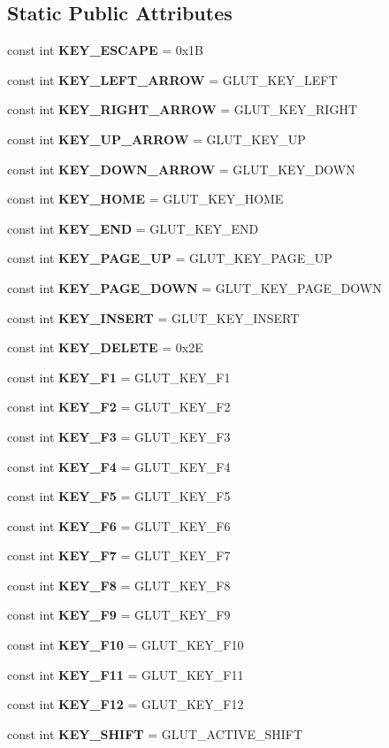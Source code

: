 \subsection*{Static Public Attributes}
\begin{CompactItemize}
\item 
const int {\bf KEY\_\-ESCAPE} = 0x1B
\item 
const int {\bf KEY\_\-LEFT\_\-ARROW} = GLUT\_\-KEY\_\-LEFT
\item 
const int {\bf KEY\_\-RIGHT\_\-ARROW} = GLUT\_\-KEY\_\-RIGHT
\item 
const int {\bf KEY\_\-UP\_\-ARROW} = GLUT\_\-KEY\_\-UP
\item 
const int {\bf KEY\_\-DOWN\_\-ARROW} = GLUT\_\-KEY\_\-DOWN
\item 
const int {\bf KEY\_\-HOME} = GLUT\_\-KEY\_\-HOME
\item 
const int {\bf KEY\_\-END} = GLUT\_\-KEY\_\-END
\item 
const int {\bf KEY\_\-PAGE\_\-UP} = GLUT\_\-KEY\_\-PAGE\_\-UP
\item 
const int {\bf KEY\_\-PAGE\_\-DOWN} = GLUT\_\-KEY\_\-PAGE\_\-DOWN
\item 
const int {\bf KEY\_\-INSERT} = GLUT\_\-KEY\_\-INSERT
\item 
const int {\bf KEY\_\-DELETE} = 0x2E
\item 
const int {\bf KEY\_\-F1} = GLUT\_\-KEY\_\-F1
\item 
const int {\bf KEY\_\-F2} = GLUT\_\-KEY\_\-F2
\item 
const int {\bf KEY\_\-F3} = GLUT\_\-KEY\_\-F3
\item 
const int {\bf KEY\_\-F4} = GLUT\_\-KEY\_\-F4
\item 
const int {\bf KEY\_\-F5} = GLUT\_\-KEY\_\-F5
\item 
const int {\bf KEY\_\-F6} = GLUT\_\-KEY\_\-F6
\item 
const int {\bf KEY\_\-F7} = GLUT\_\-KEY\_\-F7
\item 
const int {\bf KEY\_\-F8} = GLUT\_\-KEY\_\-F8
\item 
const int {\bf KEY\_\-F9} = GLUT\_\-KEY\_\-F9
\item 
const int {\bf KEY\_\-F10} = GLUT\_\-KEY\_\-F10
\item 
const int {\bf KEY\_\-F11} = GLUT\_\-KEY\_\-F11
\item 
const int {\bf KEY\_\-F12} = GLUT\_\-KEY\_\-F12
\item 
const int {\bf KEY\_\-SHIFT} = GLUT\_\-ACTIVE\_\-SHIFT
\item 

\end{CompactItemize}
